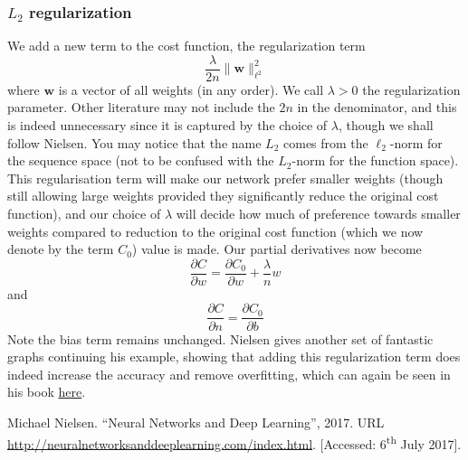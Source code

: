 \documentclass[10pt]{article}
\begin{document}
\subsubsection{$L_2$ regularization}
We add a new term to the cost function, the regularization term
\[
\frac{\lambda}{2n} \| \textbf{w} \|^2_{\ell^2}
\]
where $\textbf{w}$ is a vector of all weights (in any order). We call $\lambda >0$ the regularization parameter. Other literature may not include the $2n$ in the denominator, and this is indeed unnecessary since it is captured by the choice of $\lambda$, though we shall follow Nielsen. You may notice that the name $L_2$ comes from the $\ell_2$-norm for the sequence space (not to be confused with the $L_2$-norm for the function space). This regularisation term will make our network prefer smaller weights (though still allowing large weights provided they significantly reduce the original cost function), and our choice of $\lambda$ will decide how much of preference towards smaller weights compared to reduction to the original cost function (which we now denote by the term $C_0$) value is made. Our partial derivatives now become
\[
\frac{\partial C}{\partial w} = \frac{\partial C_0}{\partial w} + \frac{\lambda}{n}w
\] 
and
\[
\frac{\partial C}{\partial n} = \frac{\partial C_0}{\partial b}
\]
Note the bias term remains unchanged. Nielsen gives another set of fantastic graphs continuing his example, showing that adding this regularization term does indeed increase the accuracy and remove overfitting, which can again be seen in his book \href{http://neuralnetworksanddeeplearning.com/chap3.html}{here}.

\begin{thebibliography}{9}
	Michael Nielsen.
	``Neural Networks and Deep Learning'',
	2017.
	URL \url{http://neuralnetworksanddeeplearning.com/index.html}.
	[Accessed: 6\textsuperscript{th} July 2017].
\end{thebibliography}
\end{document}

